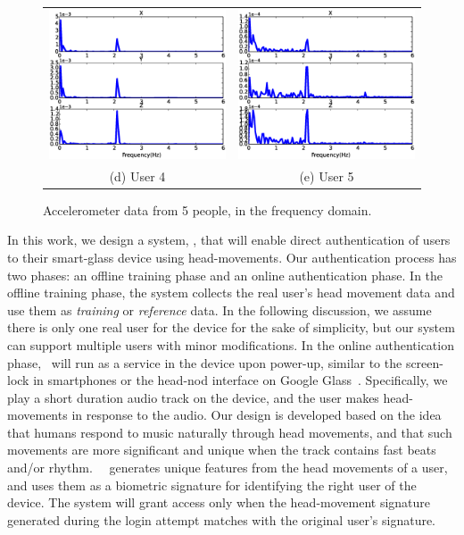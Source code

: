 \begin{figure}[t]
\begin{center}
\begin{tabular}{cc}
\includegraphics [width=.35\linewidth]{../fig/freq_sub10}&
\includegraphics [width=.35\linewidth]{../fig/freq_sub13}\\
(d) User 4& (e) User 5 \\
\end{tabular}
\end{center}
\caption{\label{fig:raw_freq} Accelerometer data from 5 people, in the frequency
domain. }
\end{figure}

In this work, we design a system, \systemname, that will enable direct authentication of users to their smart-glass device using
head-movements.  %
Our authentication process has two phases: an offline training phase and an online authentication phase. In the offline training phase, the system collects the real user's head movement data and use them as \emph{training} or \emph{reference} data. In the following discussion, we assume there is only one real user for the device for the sake of simplicity, but our system can support multiple users with minor modifications. In the online authentication phase, \systemname~will run as a service in the device upon power-up,
similar to the screen-lock in smartphones or the head-nod interface on Google
Glass~\cite{googleglass}.   Specifically, we play a short duration audio track on the device, and the user makes head-movements in response to the audio. Our design is developed based on
the idea that humans respond to music naturally through head movements, and that such movements are more
significant and unique when the track contains fast beats and/or rhythm.
~\systemname~generates unique features from the head
movements of a user, and uses them as a biometric signature for
identifying the right user of the device. The system will
grant access only when the head-movement signature
generated during the login attempt matches with the
original user's signature.

